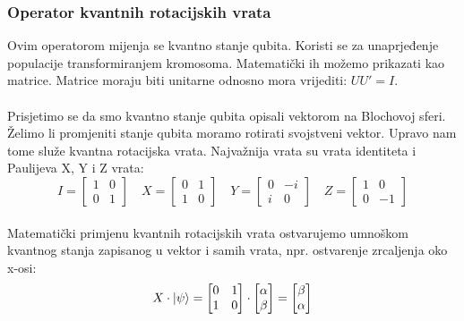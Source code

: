 \documentclass[times, utf8, zavrsni, numeric]{fer}
\begin{document}
\subsubsection{Operator kvantnih rotacijskih vrata}
Ovim operatorom mijenja se kvantno stanje qubita. Koristi se za unaprjeđenje populacije transformiranjem kromosoma. Matematički ih možemo prikazati kao matrice. Matrice moraju biti unitarne odnosno mora vrijediti: $UU' = I$.

\paragraph{}
Prisjetimo se da smo kvantno stanje qubita opisali vektorom na Blochovoj sferi. Želimo li promjeniti stanje qubita moramo rotirati svojstveni vektor. Upravo nam tome služe kvantna rotacijska vrata. Najvažnija vrata su vrata identiteta i Paulijeva X, Y i Z vrata:
\begin{equation}
I = 
\begin{bmatrix}
1 & 0 \\ 0 & 1
\end{bmatrix} \quad
X = 
\begin{bmatrix}
0 & 1 \\ 1 & 0
\end{bmatrix} \quad
Y = 
\begin{bmatrix}
0 & -i \\ i & 0
\end{bmatrix} \quad
Z = 
\begin{bmatrix}
1 & 0 \\ 0 & -1
\end{bmatrix}
\end{equation}

\paragraph{}
Matematički primjenu kvantnih rotacijskih vrata ostvarujemo umnoškom kvantnog stanja zapisanog u vektor i samih vrata, npr. ostvarenje zrcaljenja oko x-osi:
\begin{equation}
X\cdot \ket{\psi} = 
\begin{bmatrix}
0 & 1 \\ 1 & 0
\end{bmatrix} \cdot
\begin{bmatrix}
\alpha \\ \beta
\end{bmatrix}
= \begin{bmatrix}
\beta \\ \alpha
\end{bmatrix}
\end{equation}
\end{document}

